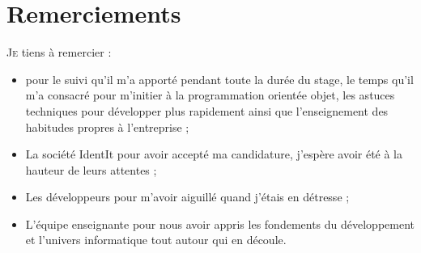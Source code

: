 \chapter*{Remerciements} %
\label{cha:Remerciements}

\lettrine{J}{e} tiens à remercier :
\begin{itemize}
    \item {} pour le suivi qu'il m'a apporté pendant toute la
    durée du stage, le temps qu'il m'a consacré pour m'initier à la
    programmation orientée objet, les astuces techniques pour développer
    plus rapidement ainsi que l'enseignement des habitudes propres à
    l'entreprise ;

    \item La société IdentIt pour avoir accepté ma candidature, j'espère avoir
    été à la hauteur de leurs attentes ;
    \item Les développeurs pour m'avoir aiguillé quand j'étais en détresse ;

    \item L'équipe enseignante pour nous avoir appris les fondements du
    développement et l'univers informatique tout autour qui en découle.
\end{itemize}
